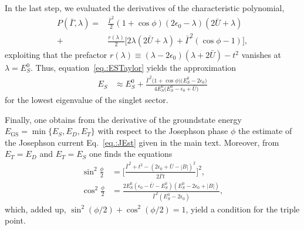 \documentclass[aps,prb,twocolumn,superscriptaddress,amsmath,amssymb,longbibliography]{revtex4-1}
\newcommand{\abs}[1]{\ensuremath{|#1|}}
\begin{document}
	In the last step, we evaluated the derivatives of the characteristic polynomial,
	\begin{align}
	P(\bar\Gamma,\lambda) ={ }&\frac{{\bar\Gamma}^2}{2}(1+\cos\phi)(2\epsilon_0-\lambda)(2\bar U+\lambda)\nonumber\\ 
	+&\frac{r(\lambda)}{2}\big[
		2\lambda(2\bar U+\lambda) + {\bar\Gamma}^2(\cos\phi-1)
	\big]
	\label{eq.:charPol},
	\end{align}
	exploiting that the prefactor $r(\lambda)\equiv(\lambda-2\epsilon_0)(\lambda+2\bar U)-t^2$ vanishes at $\lambda=E_S^0$.
	Thus, equation~\eqref{eq.:ESTaylor} yields the approximation
	\begin{align}
	E_S &\approx E_S^0 + \frac{
		\bar\Gamma^2\big(1+\cos\phi\big)\big(E_S^0-2\epsilon_0\big)
	}{
		4E_S^0 \big(E_S^0 -\epsilon_0+ \bar U \big)
	} \label{eq.:ESApprox}
	\end{align}
	for the lowest eigenvalue of the singlet sector.
	
	Finally, one obtains from the derivative of the groundstate energy $E_{\textrm{GS}} = \min\{E_S,E_D, E_T\}$ with respect
	to the Josephson phase $\phi$ the estimate of the Josephson current Eq.~\eqref{eq.:JEst} given in the main text.
	Moreover, from $E_T=E_D$ and $E_T=E_S$ one finds the equations
	\begin{align}
	\sin^2\frac{\phi}{2} &=  \Bigg[\frac{\bar\Gamma^2+t^2 -(2\epsilon_0+\bar U -\abs{B})^2}{2\bar\Gamma t}\Bigg]^2, \\
	\cos^2\frac{\phi}{2} &= \frac{2E_S^0(\epsilon_0-\bar U-E_S^0)(E_S^0-2\epsilon_0+\abs{B})}{\bar\Gamma^2(E_S^0-2\epsilon_0)},
	\end{align}
	which, added up, $\sin^2(\phi/2) +\cos^2(\phi/2)=1$, yield a condition for the triple point.
	
\end{document}
